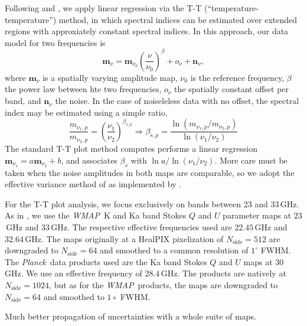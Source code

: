 \documentclass[twocolumn]{../../common/aa}
\def\WMAP{\emph{WMAP}}
\def\Planck{\emph{Planck}}
\begin{document}
Following \citet{fuskeland2014} and \citet{fuskeland:2019}, we apply linear regression via the T-T (``temperature-temperature'') method, in which spectral indices can be estimated over extended regions with approxiately constant spectral indices. In this approach, our data model for two frequencies is
\begin{equation}
	\boldsymbol m_\nu = \boldsymbol m_{\nu_0}\left(\frac\nu{\nu_0}\right)^\beta+o_\nu+\boldsymbol n_\nu ,
\end{equation}
where $\boldsymbol m_\nu$ is a spatially varying amplitude map, $\nu_0$ is the reference frequency, $\beta$ the power law between hte two frequencies, $o_\nu$ the spatially constant offset per band, and $\boldsymbol n_\nu$ the noise.  In the case of noiseleless data with no offset, the spectral index may be estimated using a simple ratio,
\begin{equation}
	\frac{m_{\nu_1,p}}{m_{\nu_2,p}}
	=\left(\frac{\nu_1}{\nu_2}\right)^{\beta_{s,p}}
	\Rightarrow
	\beta_{s,p}=\frac{\ln(m_{\nu_1,p}/m_{\nu_2,p})}{\ln(\nu_1/\nu_2)}
\end{equation}
The standard T-T plot method computes performs a linear regression $\boldsymbol m_{\nu_1}=a\boldsymbol m_{\nu_2}+b$, and associates $\beta_s$ with $\ln a/\ln(\nu_1/\nu_2)$. More care must be taken when the noise amplitudes in both maps are comparable, so we adopt the effective variance method of \citet{orear1982} as implemented by \citet{fuskeland2014}.

For the T-T plot  analysis, we focus exclusively on bands between 23 and 33\,GHz. As in \citet{fuskeland2014}, we use the \WMAP\ K and Ka band Stokes $Q$ and $U$ parameter maps at $23$\,GHz and $33$\,GHz. The respective effective frequencies used are $22.45$\,GHz and $32.64$\,GHz. The maps originally at a HealPIX pixelization of $N_\textrm{side}=512$ are downgraded to $N_\textrm{side}=64$ and smoothed to a common resolution of $1^\circ$ FWHM.
The \Planck\ data products used are the Ka band Stokes $Q$ and $U$ maps at $30$\,GHz. We use an effective frequency of $28.4$\,GHz.  The products are natively at $N_\textrm{side}=1024$, but as for the \WMAP\ products, the maps are downgraded to $N_\textrm{side}=64$ and smoothed to $1\circ$ FWHM.

Much better propagation of uncertainties with a whole suite of maps.
\end{document}
